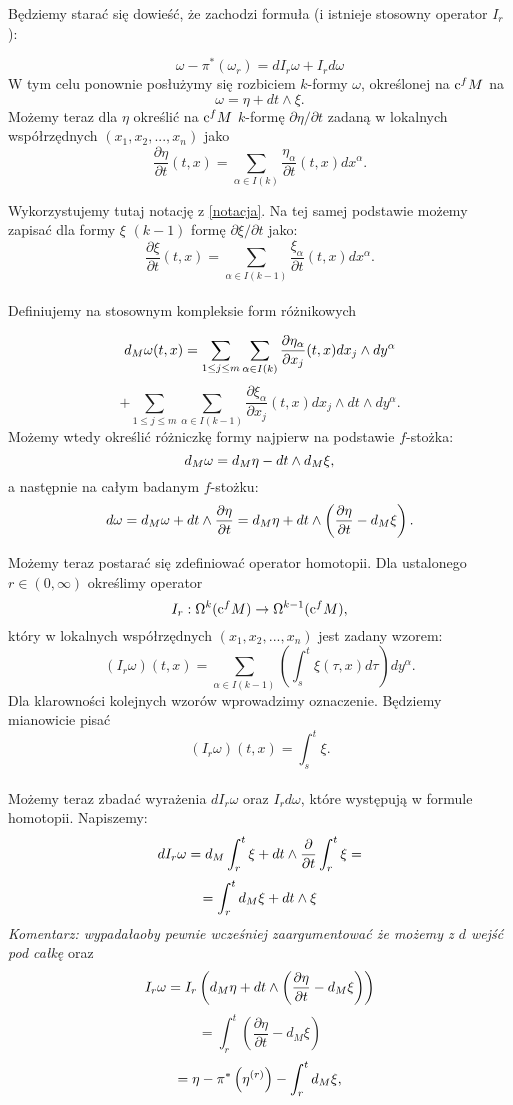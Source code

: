 \documentclass[licencjacka]{pracamgr}
\theoremstyle{definition}
\theoremstyle{definition}
\theoremstyle{plain}
\theoremstyle{plain}
\theoremstyle{plain}
\def\cfm{\ensuremath\mathrm{c}^fM}
\def\M{\ensuremath M}
\begin{document}
Będziemy starać się dowieść, że zachodzi formuła (i istnieje stosowny operator 
$I_r$):

\[
    \omega - \pi^\ast(\omega_r) = dI_r \omega + I_r d\omega
\]
W tym celu ponownie posłużymy się rozbiciem $k$-formy $\omega$, określonej na
$\cfm$ na
\[
    \omega = \eta + dt \wedge \xi.
\] 
Możemy teraz dla $\eta$ określić na $\cfm$ $k$-formę $\partial \eta / \partial
t$ zadaną w lokalnych współrzędnych $(x_1, x_2, ..., x_n)$ jako
\[
    \frac{\partial \eta}{\partial t} (t, x) =
    \sum_{\alpha \in I(k)} \frac{\eta_\alpha}{\partial t}(t, x) dx^\alpha.
\]

Wykorzystujemy tutaj notację z \ref{notacja}. Na tej samej podstawie możemy 
zapisać dla formy $\xi$ $(k-1)$ formę $\partial \xi / \partial t$ jako:
\[
    \frac{\partial \xi}{\partial t} (t, x) =
    \sum_{\alpha \in I(k-1)} \frac{\xi_\alpha}{\partial t}(t, x) dx^\alpha. 
\] \\

Definiujemy na stosownym kompleksie form różnikowych

\[
    d_\M \omega(t, x) =  
    \sum_{1 \leq j \leq m} \sum_{\alpha \in I(k)}
    \frac{\partial \eta_\alpha}{\partial x_j}(t, x) dx_j \wedge dy^\alpha
\]
\[
    + \sum_{1 \leq j \leq m} \sum_{\alpha \in I(k-1)}
    \frac{\partial \xi_\alpha}{\partial x_j}(t, x) dx_j \wedge dt \wedge dy^\alpha.
\]
Możemy wtedy określić różniczkę formy najpierw na podstawie $f$-stożka:
\[
    d_\M \omega = d_\M \eta - dt \wedge d_\M \xi,
\]
a następnie na całym badanym $f$-stożku:
\[
    d \omega = 
    d_\M \omega + dt \wedge \frac{\partial \eta}{\partial t} = 
    d_\M \eta + dt \wedge \left( 
        \frac{\partial \eta}{\partial t} - d_\M \xi
    \right). \\
\]

Możemy teraz postarać się zdefiniować operator homotopii.
Dla ustalonego $r \in (0, \infty)$ określimy operator
\[
    I_r: \Omega^k(\cfm) \rightarrow \Omega^{k-1}(\cfm),
\]
który w lokalnych współrzędnych $(x_1, x_2, ..., x_n)$ jest zadany wzorem:
\[
    (I_r \omega)(t, x) = \sum_{\alpha \in I(k-1)}
      \left(
          \int_s^t \xi(\tau, x) d\tau 
      \right) dy^\alpha.
\] 
Dla klarowności kolejnych wzorów wprowadzimy oznaczenie. Będziemy mianowicie pisać
\[
    (I_r \omega)(t, x) = \int_s^t \xi.
\] \\

Możemy teraz zbadać wyrażenia $d I_r \omega$ oraz $I_r d \omega$, które występują
w formule homotopii. Napiszemy:
\[
    d I_r \omega = d_\M \int_r^t \xi + dt \wedge \frac{\partial}{\partial t} \int_r^t \xi =
\]
\[
    = \int_r^t d_\M \xi + dt \wedge \xi
\]
\emph{Komentarz: wypadałaoby pewnie wcześniej zaargumentować że możemy z $d$ wejść pod całkę}
oraz
\[
    I_r \omega = I_r
    \left(
        d_\M \eta + dt \wedge \left( \frac{\partial \eta}{\partial t} - d_\M \xi \right)
    \right)
\]
\[
    = \int_r^t 
        \left(
            \frac{\partial \eta}{\partial t} - d_M \xi
        \right)
\]
\[
    = \eta - \pi^\ast \left( \eta^{(r)} \right) - \int_r^t d_\M \xi,
\]
\end{document}
